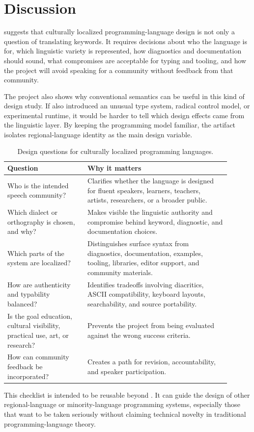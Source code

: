 \section{Discussion}

\plat{} suggests that culturally localized programming-language design is not
only a question of translating keywords. It requires decisions about who the
language is for, which linguistic variety is represented, how diagnostics and
documentation should sound, what compromises are acceptable for typing and
tooling, and how the project will avoid speaking for a community without
feedback from that community.

The project also shows why conventional semantics can be useful in this kind
of design study. If \plat{} also introduced an unusual type system, radical
control model, or experimental runtime, it would be harder to tell which design
effects came from the linguistic layer. By keeping the programming model
familiar, the artifact isolates regional-language identity as the main design
variable.

\begin{table}[t]
\centering
\caption{Design questions for culturally localized programming languages.}
\label{tab:checklist}
\begin{tabular}{p{0.32\linewidth}p{0.58\linewidth}}
\toprule
\textbf{Question} & \textbf{Why it matters} \\
\midrule
Who is the intended speech community? &
Clarifies whether the language is designed for fluent speakers, learners,
teachers, artists, researchers, or a broader public. \\
Which dialect or orthography is chosen, and why? &
Makes visible the linguistic authority and compromise behind keyword,
diagnostic, and documentation choices. \\
Which parts of the system are localized? &
Distinguishes surface syntax from diagnostics, documentation, examples,
tooling, libraries, editor support, and community materials. \\
How are authenticity and typability balanced? &
Identifies tradeoffs involving diacritics, ASCII compatibility, keyboard
layouts, searchability, and source portability. \\
Is the goal education, cultural visibility, practical use, art, or research? &
Prevents the project from being evaluated against the wrong success criteria. \\
How can community feedback be incorporated? &
Creates a path for revision, accountability, and speaker participation. \\
\bottomrule
\end{tabular}
\end{table}

This checklist is intended to be reusable beyond \plat. It can guide the
design of other regional-language or minority-language programming systems,
especially those that want to be taken seriously without claiming technical
novelty in traditional programming-language theory.

